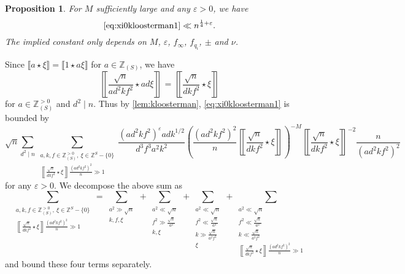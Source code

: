 \documentclass[10pt,oneside,reqno]{amsart}
\makeatletter
\newcommand\ZZ{\mathbb{Z}}
\theoremstyle{THEOREM}
\newtheorem{proposition}[theorem]{Proposition}
\theoremstyle{DEFINITION}
\theoremstyle{EXERCISE}
\numberwithin{equation}{section}
\renewenvironment{proof}[1][\proofname]{\par
  \vspace{-6pt}
  \pushQED{\qed}
  \normalfont \topsep6\p@\@plus6\p@\relax
  \trivlist
  \item[\hskip\labelsep\rmfamily\bfseries
    #1\@addpunct{:}]\ignorespaces
}{
  \popQED\endtrivlist\@endpefalse
  \vspace{-6pt}
}
\makeatother
\begin{document}
\begin{proposition}\label{prop:xi0kloosterman1}
For $M$ sufficiently large and any $\varepsilon>0$, we have
\[
\eqref{eq:xi0kloosterman1}\ll n^{\frac14+\varepsilon}.
\]
The implied constant only depends on $M$, $\varepsilon$, $f_\infty$, $f_{q_i}$, $\pm$ and $\nu$.
\end{proposition}
\begin{proof}
Since $\llbracket a \star \xi\rrbracket=\llbracket 1 \star a\xi\rrbracket$ for $a\in \ZZ_{(S)}$, we have
\[
\left\llbracket\frac{\sqrt{n}}{ad^2kf^2}\star ad\xi\right\rrbracket=\left\llbracket\frac{\sqrt{n}}{dkf^2}\star \xi\right\rrbracket
\]
for $a\in \ZZ_{(S)}^{>0}$ and $d^2\mid n$. Thus by \autoref{lem:kloosterman}, \eqref{eq:xi0kloosterman1} is bounded by
\[
\sqrt{n}\sum_{d^2\mid n}\sum_{\substack{a,k,f\in \ZZ_{(S)}^{>0},\ \xi\in \ZZ^S-\{0\}\\\left\llbracket\frac{\sqrt{n}}{dkf^2}\star \xi\right\rrbracket\frac {(ad^2kf^2)^2}{n} \gg 1}}\frac{(ad^2kf^2)^\varepsilon adk^{1/2}}{d^3f^3a^2k^2} \left(\frac{(ad^2kf^2)^2}{n}\left\llbracket\frac{\sqrt{n}}{dkf^2}\star \xi\right\rrbracket\right)^{-M}\left\llbracket\frac{\sqrt{n}}{dkf^2}\star \xi\right\rrbracket^{-2}\frac{n}{(ad^2kf^2)^2}
\]
for any $\varepsilon>0$.
We decompose the above sum as
\[
\sum_{\substack{a,k,f\in \ZZ_{(S)}^{>0},\ \xi\in \ZZ^S-\{0\}\\\left\llbracket\frac{\sqrt{n}}{dkf^2}\star \xi\right\rrbracket\frac {(ad^2kf^2)^2}{n} \gg 1}}=\sum_{\substack{a^2\gg \sqrt {n}\\k,f,\xi}}+ \sum_{\substack{a^2\ll \sqrt {n}\\ f^2\gg \frac{\sqrt{n}}{a^2}\\k,\xi}}+ \sum_{\substack{a^2\ll \sqrt {n}\\ f^2\ll \frac{\sqrt{n}}{a^2}\\ k\gg \frac{\sqrt{n}}{a^2f^2} \\\xi}}+\sum_{\substack{a^2\ll \sqrt {n}\\ f^2\ll \frac{\sqrt{n}}{a^2}\\ k\ll \frac{\sqrt{n}}{a^2f^2} \\\left\llbracket\frac{\sqrt{n}}{dkf^2}\star \xi\right\rrbracket\frac {(ad^2kf^2)^2}{n} \gg 1}}
\]
and bound these four terms separately. 


\end{proof}
\end{document}
